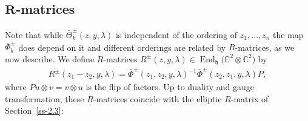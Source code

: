\documentclass[pdftex]{sigma}
\numberwithin{equation}{section}
\begin{document}
\subsection[$R$-matrices]{$\boldsymbol{R}$-matrices}\label{ss-3.6}
Note that while $\bar\Theta^{\pm}_k(z,y,\lambda)$ is independent of the ordering of $z_1,\dots,z_n$ the map $\bar\Phi_k^\pm$ does depend on it and different orderings are related by $R$-matrices, as we now describe. We
define $R$-matrices $R^\pm(z,y,\lambda)\in\operatorname{End}_{\mathfrak h}\big(\mathbb C^2\otimes\mathbb C^2\big)$ by
\begin{gather*}
 R^{\pm}(z_1-z_2,y,\lambda) =\bar\Phi^\pm(z_1,z_2,y,\lambda)^{-1} \bar\Phi^\pm(z_2,z_1,y,\lambda)P,
\end{gather*}
where $Pu\otimes v=v\otimes u$ is the flip of factors. Up to duality and gauge transformation, these $R$-matrices coincide with the elliptic $R$-matrix of Section~\ref{ss-2.3}:
\end{document}
